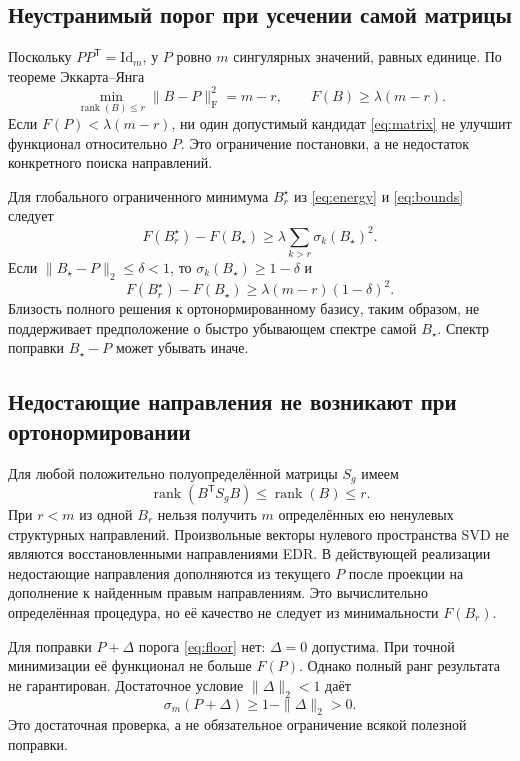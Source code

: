 \documentclass[11pt,a4paper]{article}
\numberwithin{equation}{section}
\theoremstyle{remark}
\newcommand{\Id}{\mathrm{Id}}
\newcommand{\T}{^{\mathsf T}}
\newcommand{\F}{_{\mathrm F}}
\DeclareMathOperator{\rank}{rank}
\begin{document}
\subsection{Неустранимый порог при усечении самой матрицы}
Поскольку $PP\T=\Id_m$, у $P$ ровно $m$ сингулярных значений, равных единице.
По теореме Эккарта--Янга
\begin{equation}\label{eq:floor}
 \min_{\rank(B)\le r}\|B-P\|\F^2=m-r,
 \qquad F(B)\ge\lambda(m-r).
\end{equation}
Если $F(P)<\lambda(m-r)$, ни один допустимый кандидат \eqref{eq:matrix}
не улучшит функционал относительно $P$.
Это ограничение постановки, а не недостаток конкретного поиска направлений.

Для глобального ограниченного минимума $B_r^\star$ из \eqref{eq:energy}
и \eqref{eq:bounds} следует
\begin{equation}\label{eq:ranktail}
 F(B_r^\star)-F(B_\star)
 \ge\lambda\sum_{k>r}\sigma_k(B_\star)^2.
\end{equation}
Если $\|B_\star-P\|_2\le\delta<1$, то
$\sigma_k(B_\star)\ge1-\delta$ и
\begin{equation}\label{eq:nearprior}
 F(B_r^\star)-F(B_\star)
 \ge\lambda(m-r)(1-\delta)^2.
\end{equation}
Близость полного решения к ортонормированному базису, таким образом,
не поддерживает предположение о быстро убывающем спектре самой $B_\star$.
Спектр поправки $B_\star-P$ может убывать иначе.

\subsection{Недостающие направления не возникают при ортонормировании}
Для любой положительно полуопределённой матрицы $S_g$ имеем
\[
 \rank(B\T S_gB)\le\rank(B)\le r.
\]
При $r<m$ из одной $B_r$ нельзя получить $m$ определённых ею ненулевых
структурных направлений. Произвольные векторы нулевого пространства SVD
не являются восстановленными направлениями EDR.
В действующей реализации недостающие направления дополняются из текущего
$P$ после проекции на дополнение к найденным правым направлениям.
Это вычислительно определённая процедура, но её качество не следует из
минимальности $F(B_r)$.

Для поправки $P+\Delta$ порога \eqref{eq:floor} нет: $\Delta=0$ допустима.
При точной минимизации её функционал не больше $F(P)$.
Однако полный ранг результата не гарантирован. Достаточное условие
$\|\Delta\|_2<1$ даёт
\begin{equation}\label{eq:rankpreserve}
 \sigma_m(P+\Delta)\ge1-\|\Delta\|_2>0.
\end{equation}
Это достаточная проверка, а не обязательное ограничение всякой полезной
поправки.
\end{document}

